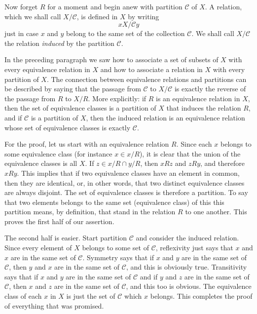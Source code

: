 Now forget $R$ for a moment and begin anew with partition $\mathcal{C}$ of $X$. A relation, which we shall call $X / \mathcal{C}$, is defined in $X$ by writing
\[
	x X / \mathcal{C} y
\]
just in case $x$ and $y$ belong to the same set of the collection $\mathcal{C}$. We shall call $X / \mathcal{C}$ the relation \textit{induced} by the partition $\mathcal{C}$.

In the preceding paragraph we saw how to associate a set of subsets of $X$ with every equivalence relation in $X$ and how to associate a relation in $X$ with every partition of $X$. The connection between equivalence relations and partitions can be described by saying that the passage from $\mathcal{C}$ to $X / \mathcal{C}$ is exactly the reverse of the passage from $R$ to $X / R$. More explicitly: if $R$ is an equivalence relation in $X$, then the set of equivalence classes is a partition of $X$ that induces the relation $R$, and if $\mathcal{C}$ is a partition of $X$, then the induced relation is an equivalence relation whose set of equivalence classes is exactly $\mathcal{C}$.

For the proof, let us start with an equivalence relation $R$. Since each $x$ belongs to some equivalence class (for instance $x \in x / R$), it is clear that the union of the equivalence classes is all $X$. If $z \in x / R \cap y / R$, then $x R z$ and $z R y$, and therefore $x R y$. This implies that if two equivalence classes have an element in common, then they are identical, or, in other words, that two distinct equivalence classes are always disjoint. The set of equivalence classes is therefore a partition. To say that two elements belongs to the same set (equivalence class) of this this partition means, by definition, that stand in the relation $R$ to one another. This proves the first half of our assertion.

The second half is easier. Start partition $\mathcal{C}$ and consider the induced relation. Since every element of $X$ belongs to some set of $\mathcal{C}$, reflexivity just says that $x$ and $x$ are in the same set of $\mathcal{C}$. Symmetry says that if $x$ and $y$ are in the same set of $\mathcal{C}$, then $y$ and $x$ are in the same set of $\mathcal{C}$, and this is obviously true. Transitivity says that if $x$ and $y$ are in the same set of $\mathcal{C}$ and if $y$ and $z$ are in the same set of $\mathcal{C}$, then $x$ and $z$ are in the same set of $\mathcal{C}$, and this too is obvious. The equivalence class of each $x$ in $X$ is just the set of $\mathcal{C}$ which $x$ belongs. This completes the proof of everything that was promised.